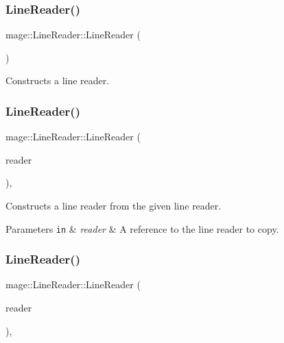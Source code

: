 \subsubsection{\texorpdfstring{Line\+Reader()}{LineReader()}\hspace{0.1cm}{\footnotesize\ttfamily [1/3]}}
{\footnotesize\ttfamily mage\+::\+Line\+Reader\+::\+Line\+Reader (\begin{DoxyParamCaption}{ }\end{DoxyParamCaption})\hspace{0.3cm}{\ttfamily [protected]}}

Constructs a line reader. \mbox{\label{classmage_1_1_line_reader_ae4f871bebae110704b34c0bd88460639}} 
\subsubsection{\texorpdfstring{Line\+Reader()}{LineReader()}\hspace{0.1cm}{\footnotesize\ttfamily [2/3]}}
{\footnotesize\ttfamily mage\+::\+Line\+Reader\+::\+Line\+Reader (\begin{DoxyParamCaption}\item[{const \mbox{\hyperlink{classmage_1_1_line_reader}{Line\+Reader}} \&}]{reader }\end{DoxyParamCaption})\hspace{0.3cm}{\ttfamily [protected]}, {\ttfamily [delete]}}

Constructs a line reader from the given line reader.


\begin{DoxyParams}[1]{Parameters}
\mbox{\tt in}  & {\em reader} & A reference to the line reader to copy. \\
\hline
\end{DoxyParams}
\mbox{\label{classmage_1_1_line_reader_ae90c546a98e113a48ca1c94b854a4866}} 
\subsubsection{\texorpdfstring{Line\+Reader()}{LineReader()}\hspace{0.1cm}{\footnotesize\ttfamily [3/3]}}
{\footnotesize\ttfamily mage\+::\+Line\+Reader\+::\+Line\+Reader (\begin{DoxyParamCaption}\item[{\mbox{\hyperlink{classmage_1_1_line_reader}{Line\+Reader}} \&\&}]{reader }\end{DoxyParamCaption})\hspace{0.3cm}{\ttfamily [protected]}, {\ttfamily [noexcept]}}

